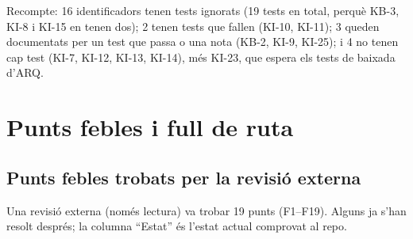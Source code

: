 \documentclass[11pt,a4paper]{article}
\DeclareRobustCommand{\_}{\textunderscore\allowbreak}
\begin{document}
Recompte: 16 identificadors tenen tests ignorats (19 tests en total, perquè KB-3, KI-8 i KI-15
en tenen dos); 2 tenen tests que fallen (KI-10, KI-11); 3 queden documentats per un test que
passa o una nota (KB-2, KI-9, KI-25); i 4 no tenen cap test (KI-7, KI-12, KI-13, KI-14), més
KI-23, que espera els tests de baixada d'ARQ.

\section{Punts febles i full de ruta}\label{sec:roadmap}

\subsection{Punts febles trobats per la revisió externa}

Una revisió externa (només lectura) va trobar 19 punts (F1–F19). Alguns ja s'han
resolt després; la columna ``Estat'' és l'estat actual comprovat al repo.
\end{document}
